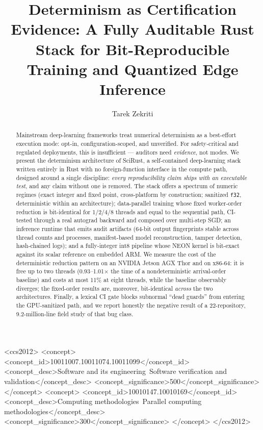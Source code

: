 \documentclass[sigconf,review]{acmart}
\begin{document}
\title{Determinism as Certification Evidence: A Fully Auditable Rust Stack
for Bit-Reproducible Training and Quantized Edge Inference}

\author{Tarek Zekriti}

\begin{abstract}
Mainstream deep-learning frameworks treat numerical determinism as a
best-effort execution mode: opt-in, configuration-scoped, and unverified.
For safety-critical and regulated deployments, this is insufficient ---
auditors need \emph{evidence}, not modes. We present the determinism
architecture of SciRust, a self-contained deep-learning stack written
entirely in Rust with no foreign-function interface in the compute path,
designed around a single discipline: \emph{every reproducibility claim ships
with an executable test}, and any claim without one is removed. The stack
offers a spectrum of numeric regimes (exact integer and fixed point,
cross-platform by construction; sanitized \texttt{f32}, deterministic within
an architecture); data-parallel training whose fixed worker-order reduction
is bit-identical for 1/2/4/8 threads and equal to the sequential path,
CI-tested through a real autograd backward and composed over multi-step SGD;
an inference runtime that emits audit artifacts (64-bit output fingerprints
stable across thread counts and processes, manifest-based model
reconstruction, tamper detection, hash-chained logs); and a fully-integer
int8 pipeline whose NEON kernel is bit-exact against its scalar reference on
embedded ARM. We measure the cost of the deterministic reduction pattern on
an NVIDIA Jetson AGX Thor and on x86-64: it is free up to two threads
(0.93--1.01$\times$ the time of a nondeterministic arrival-order baseline)
and costs at most 11\% at eight threads, while the baseline observably
diverges; the fixed-order results are, moreover, bit-identical
\emph{across} the two architectures. Finally, a lexical CI gate blocks
subnormal ``dead guards'' from entering the GPU-sanitized path, and we
report honestly the negative result of a 22-repository, 9.2-million-line
field study of that bug class.
\end{abstract}

\begin{CCSXML}
<ccs2012>
<concept>
<concept_id>10011007.10011074.10011099</concept_id>
<concept_desc>Software and its engineering~Software verification and validation</concept_desc>
<concept_significance>500</concept_significance>
</concept>
<concept>
<concept_id>10010147.10010169</concept_id>
<concept_desc>Computing methodologies~Parallel computing methodologies</concept_desc>
<concept_significance>300</concept_significance>
</concept>
</ccs2012>
\end{CCSXML}
\end{document}
